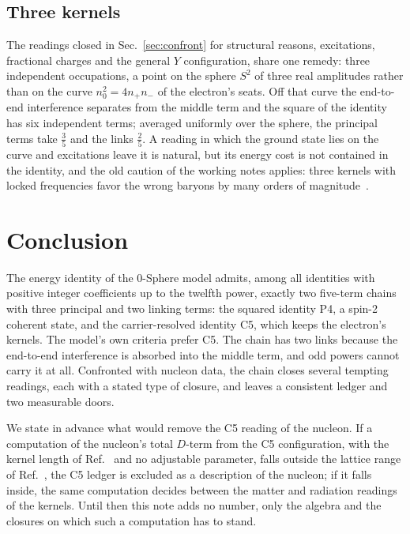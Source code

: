 \documentclass[%
 reprint, amsmath,amssymb, aps, prb, ]{revtex4-2}
\numberwithin{equation}{section}
\begin{document}
\subsection{Three kernels}

The readings closed in Sec.~\ref{sec:confront} for structural reasons, excitations, fractional charges and the general $Y$ configuration, share one remedy: three independent occupations, a point on the sphere $S^2$ of three real amplitudes rather than on the curve $n_0^2=4n_+n_-$ of the electron's seats. Off that curve the end-to-end interference separates from the middle term and the square of the identity has six independent terms; averaged uniformly over the sphere, the principal terms take $\frac35$ and the links $\frac25$. A reading in which the ground state lies on the curve and excitations leave it is natural, but its energy cost is not contained in the identity, and the old caution of the working notes applies: three kernels with locked frequencies favor the wrong baryons by many orders of magnitude~\cite{ref:trunks}.

\section{Conclusion}
\label{sec:concl}

The energy identity of the 0-Sphere model admits, among all identities with positive integer coefficients up to the twelfth power, exactly two five-term chains with three principal and two linking terms: the squared identity P4, a spin-2 coherent state, and the carrier-resolved identity C5, which keeps the electron's kernels. The model's own criteria prefer C5. The chain has two links because the end-to-end interference is absorbed into the middle term, and odd powers cannot carry it at all. Confronted with nucleon data, the chain closes several tempting readings, each with a stated type of closure, and leaves a consistent ledger and two measurable doors.

We state in advance what would remove the C5 reading of the nucleon. If a computation of the nucleon's total $D$-term from the C5 configuration, with the kernel length of Ref.~\cite{ref:p61} and no adjustable parameter, falls outside the lattice range of Ref.~\cite{ref:hps}, the C5 ledger is excluded as a description of the nucleon; if it falls inside, the same computation decides between the matter and radiation readings of the kernels. Until then this note adds no number, only the algebra and the closures on which such a computation has to stand.
\end{document}
